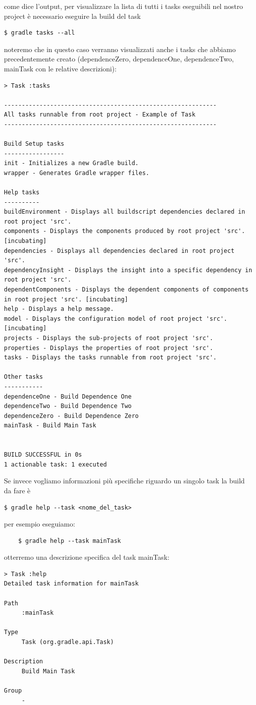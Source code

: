 come dice l'output, per visualizzare la lista di tutti i tasks eseguibili nel nostro project è necessario eseguire la build del task \begin{verbatim}$ gradle tasks --all \end{verbatim} noteremo che in questo caso verranno visualizzati anche i tasks che abbiamo precedentemente creato (dependenceZero, dependenceOne, dependenceTwo, mainTask con le relative descrizioni):
\begin{verbatim}
> Task :tasks 

------------------------------------------------------------
All tasks runnable from root project - Example of Task
------------------------------------------------------------

Build Setup tasks
-----------------
init - Initializes a new Gradle build.
wrapper - Generates Gradle wrapper files.

Help tasks
----------
buildEnvironment - Displays all buildscript dependencies declared in root project 'src'.
components - Displays the components produced by root project 'src'. [incubating]
dependencies - Displays all dependencies declared in root project 'src'.
dependencyInsight - Displays the insight into a specific dependency in root project 'src'.
dependentComponents - Displays the dependent components of components in root project 'src'. [incubating]
help - Displays a help message.
model - Displays the configuration model of root project 'src'. [incubating]
projects - Displays the sub-projects of root project 'src'.
properties - Displays the properties of root project 'src'.
tasks - Displays the tasks runnable from root project 'src'.

Other tasks
-----------
dependenceOne - Build Dependence One
dependenceTwo - Build Dependence Two
dependenceZero - Build Dependence Zero
mainTask - Build Main Task


BUILD SUCCESSFUL in 0s
1 actionable task: 1 executed
\end{verbatim}
Se invece vogliamo informazioni più specifiche riguardo un singolo task la build da fare è \begin{verbatim}$ gradle help --task <nome_del_task>\end{verbatim}per esempio eseguiamo:
\begin{verbatim}
    $ gradle help --task mainTask\end{verbatim}
otterremo una descrizione specifica del task mainTask:
\begin{verbatim}
> Task :help 
Detailed task information for mainTask

Path
     :mainTask

Type
     Task (org.gradle.api.Task)

Description
     Build Main Task

Group
     -\end{verbatim}

